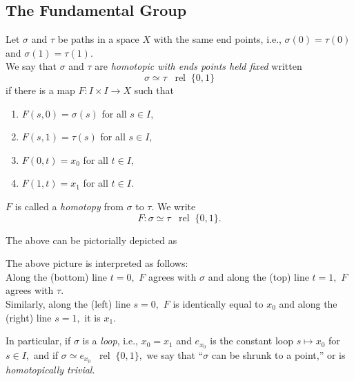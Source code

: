 \documentclass[12pt]{article}
\newcommand{\rel}{\;\;\operatorname{rel}\;}
\begin{document}
\subsection{The Fundamental Group}

\begin{defn}[Homotopy]
	Let $\sigma$ and $\tau$ be paths in a space $X$ with the same end points, i.e., $\sigma(0) = \tau(0)$ and $\sigma(1) = \tau(1).$\\
	We say that $\sigma$ and $\tau$ are \emph{homotopic with ends points held fixed} written
	\begin{equation*} 
		\sigma \simeq \tau \rel \{0, 1\}
	\end{equation*}
	if there is a map $F: I \times I \to X$ such that
	\begin{enumerate}
		\item $F(s, 0) = \sigma(s)$ for all $s \in I,$
		\item $F(s, 1) = \tau(s)$ for all $s \in I,$
		\item $F(0, t) = x_0$ for all $t \in I,$
		\item $F(1, t) = x_1$ for all $t \in I.$
	\end{enumerate}
	$F$ is called a \emph{homotopy} from $\sigma$ to $\tau.$ We write
	\begin{equation*} 
		F : \sigma \simeq \tau \rel \{0, 1\}.
	\end{equation*}
\end{defn}
The above can be pictorially depicted as

\begin{center}
\end{center}

The above picture is interpreted as follows: \\
Along the (bottom) line $t = 0,$ $F$ agrees with $\sigma$ and along the (top) line $t = 1,$ $F$ agrees with $\tau.$\\
Similarly, along the (left) line $s = 0,$ $F$ is identically equal to $x_0$ and along the (right) line $s = 1,$ it is $x_1.$

%
In particular, if $\sigma$ is a \emph{loop}, i.e., $x_0 = x_1$ and $e_{x_0}$ is the constant loop $s \mapsto x_0$ for $s \in I,$ and if $\sigma \simeq e_{x_0} \rel \{0, 1\},$ we say that ``$\sigma$ can be shrunk to a point,'' or is \emph{homotopically trivial}.
\end{document}
